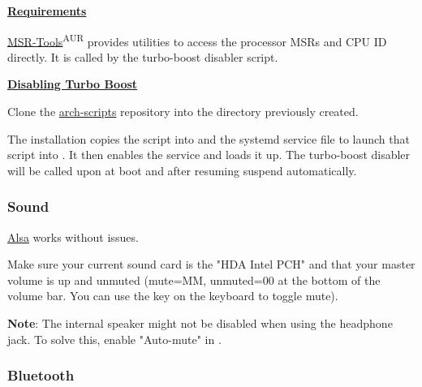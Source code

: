 \textbf{\textcolor{textgrey}{\underline{Requirements}}}

\href{https://01.org/msr-tools}{MSR-Tools}\textsuperscript{AUR} provides utilities to access the processor MSRs and CPU ID directly. It is called by the turbo-boost disabler script.


\vspace*{1em}
\textbf{\textcolor{textgrey}{\underline{Disabling Turbo Boost}}}

Clone the \href{https://github.com/An7ar35/arch-scripts}{arch-scripts} repository into the  directory previously created.

\begin{blocksection}
	The installation copies the  script into  and the systemd service file to launch that script into .\newline
	It then enables the service and loads it up. The turbo-boost disabler will be called upon at boot and after resuming suspend automatically.
\end{blocksection}

\subsubsection{Sound}

\href{https://wiki.archlinux.org/index.php/ALSA}{Alsa} works without issues.

\begin{blocksection}
	Make sure your current sound card is the "HDA Intel PCH" and that your master volume is up and unmuted (mute=MM, unmuted=00 at the bottom of the volume bar. You can use the  key on the keyboard to toggle mute).
\end{blocksection}

\textbf{Note}: The internal speaker might not be disabled when using the headphone jack. To solve this, enable "Auto-mute" in .

\subsubsection{Bluetooth}

